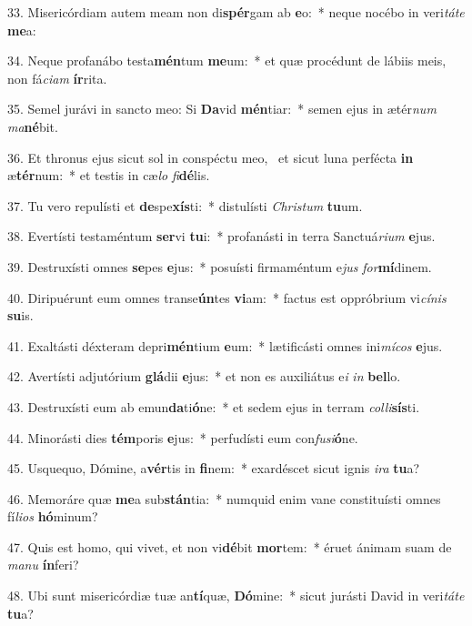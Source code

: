 33. Misericórdiam autem meam non di\textbf{spér}gam ab \textbf{e}o:~*  neque nocébo in veri\textit{tá}\textit{te} \textbf{me}a:\

34. Neque profanábo testa\textbf{mén}tum \textbf{me}um:~*  et quæ procédunt de lábiis meis, non fá\textit{ci}\textit{am} \textbf{ír}rita.\

35. Semel jurávi in sancto meo: Si \textbf{Da}vid \textbf{mén}tiar:~*  semen ejus in ætér\textit{num} \textit{ma}\textbf{né}bit.\

36. Et thronus ejus sicut sol in conspéctu meo, \dag\  et sicut luna perfécta \textbf{in} æ\textbf{tér}num:~*  et testis in cæ\textit{lo} \textit{fi}\textbf{dé}lis.\

37. Tu vero repulísti et \textbf{de}spe\textbf{xís}ti:~*  distulísti \textit{Chris}\textit{tum} \textbf{tu}um.\

38. Evertísti testaméntum \textbf{ser}vi \textbf{tu}i:~*  profanásti in terra Sanctuá\textit{ri}\textit{um} \textbf{e}jus.\

39. Destruxísti omnes \textbf{se}pes \textbf{e}jus:~*  posuísti firmaméntum e\textit{jus} \textit{for}\textbf{mí}dinem.\

40. Diripuérunt eum omnes transe\textbf{ún}tes \textbf{vi}am:~*  factus est oppróbrium vi\textit{cí}\textit{nis} \textbf{su}is.\

41. Exaltásti déxteram depri\textbf{mén}tium \textbf{e}um:~*  lætificásti omnes ini\textit{mí}\textit{cos} \textbf{e}jus.\

42. Avertísti adjutórium \textbf{glá}dii \textbf{e}jus:~*  et non es auxiliátus e\textit{i} \textit{in} \textbf{bel}lo.\

43. Destruxísti eum ab emun\textbf{da}ti\textbf{ó}ne:~*  et sedem ejus in terram \textit{col}\textit{li}\textbf{sís}ti.\

44. Minorásti dies \textbf{tém}poris \textbf{e}jus:~*  perfudísti eum con\textit{fu}\textit{si}\textbf{ó}ne.\

45. Usquequo, Dómine, a\textbf{vér}tis in \textbf{fi}nem:~*  exardéscet sicut ignis \textit{i}\textit{ra} \textbf{tu}a?\

46. Memoráre quæ \textbf{me}a sub\textbf{stán}tia:~*  numquid enim vane constituísti omnes fí\textit{li}\textit{os} \textbf{hó}minum?\

47. Quis est homo, qui vivet, et non vi\textbf{dé}bit \textbf{mor}tem:~*  éruet ánimam suam de \textit{ma}\textit{nu} \textbf{ín}feri?\

48. Ubi sunt misericórdiæ tuæ an\textbf{tí}quæ, \textbf{Dó}mine:~*  sicut jurásti David in veri\textit{tá}\textit{te} \textbf{tu}a?\

